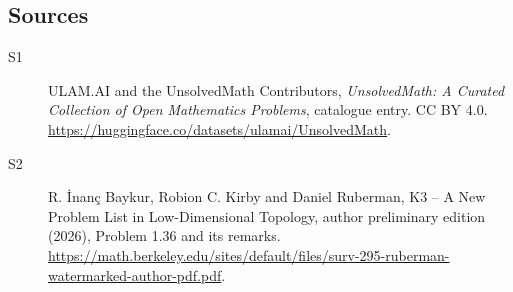 \documentclass[11pt]{article}
\begin{document}
\subsection{Sources}
\begin{description}
\item[\hypertarget{source:statement:1}{S1}] ULAM.AI and the UnsolvedMath Contributors, \emph{UnsolvedMath: A Curated Collection of Open Mathematics Problems}, catalogue entry. CC BY 4.0. \url{https://huggingface.co/datasets/ulamai/UnsolvedMath}.
\item[\hypertarget{source:statement:2}{S2}] R. \.{I}nan\c{c} Baykur, Robion C. Kirby and Daniel Ruberman, K3 -- A New Problem List in Low-Dimensional Topology, author preliminary edition (2026), Problem 1.36 and its remarks. \url{https://math.berkeley.edu/sites/default/files/surv-295-ruberman-watermarked-author-pdf.pdf}.
\end{description}
\label{end:statement}
\end{document}
